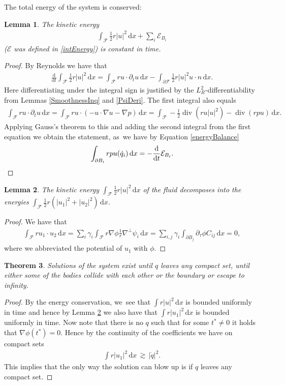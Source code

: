 \documentclass[JEP,XML,SOM,Unicode,published]{cedram}
\newtheorem{theorem}{Theorem}[subsection]
\newtheorem{lemma}[theorem]{Lemma}
\theoremstyle{definition}
\renewcommand{\div}{\operatorname{div}}
\newcommand\eq{=}
\newcommand\dd{\,\mathrm{d}}
\newcommand\dx{\dd x}
\let\de\partial
\begin{document}
The total energy of the system is conserved: \begin{lemma}\label{Lem:Energy}
The kinetic energy
\begin{align*}\int_{\mathcal{F}}\frac{1}{2}r|u|^2\dx+\sum_i\mathcal{E}_{B_i}
\end{align*}
($\mathcal{E}$ was defined in \eqref{intEnergy}) is constant in time.
\end{lemma}
\begin{proof}
By Reynolds we have that
\begin{align*}
\frac{\text{d}}{\text{d}t}\int_{\mathcal{F}}\frac{1}{2}r|u|^2\dx\eq\int_{\mathcal{F}}ru\cdot\de_t u\dx-\int_{\de\mathcal{F}}\frac{1}{2}r|u|^2u\cdot n\dx.
\end{align*}
Here differentiating under the integral sign is justified by the $L_R^2$-differentiability from Lemmas \ref{SmoothnessInq} and \ref{PsiDeri}. The first integral also equals
\begin{align*}
\int_{\mathcal{F}}ru\cdot\de_t u\dx\eq\int_{\mathcal{F}}ru\cdot(-u\cdot\nabla u-\nabla p)\dx\eq\int_{\mathcal{F}}-\frac{1}{2}\div(ru|u|^2)-\div(rpu)\dx.
\end{align*}
Applying Gauss's theorem to this and adding the second integral from the first equation we obtain the statement, as~we have by Equation \eqref{energyBalance}
\[
\int_{\de B_i}rpu(\dot{q}_i)\dx\eq-\frac{\text{d}}{\text{d}t}\mathcal{E}_{B_i}.\qedhere
\]
\end{proof}

\begin{lemma}\label{EnergySplitting}
The kinetic energy $\int_{\mathcal{F}}\frac{1}{2}r|u|^2\dx$ of the fluid decomposes into the energies $\int_{\mathcal{F}} \frac{1}{2}r(|u_1|^2+|u_2|^2)\dx$.
\end{lemma}
\begin{proof}
We have that
\begin{align*}
\int_{\mathcal{F}}ru_1\cdot u_2\dx\eq\sum_i\gamma_i\int_{\mathcal{F}}r\nabla\phi\frac{1}{r}\nabla^\perp\psi_i\dx\eq\sum_{i,j}\gamma_i\int_{\de B_j}\de_\tau\phi C_{ij}\dx\eq 0,
\end{align*}
where we abbreviated the potential of $u_1$ with $\phi$.
\end{proof}

\begin{theorem}\label{Thm:exist}
Solutions of the system exist until $q$ leaves any compact set, \ie until either some of the bodies collide with each other or the boundary or escape to infinity.
\end{theorem}
\begin{proof}
By the energy conservation, we~see that $\int r|u|^2\dx$ is bounded uniformly in time and hence by Lemma \ref{EnergySplitting} we also have that $\int r|u_1|^2\dx$ is bounded uniformly in time. Now note that there is no $q$ such that for some $t^*\neq 0$ it holds that $\nabla\phi(t^*)=0$. Hence by the continuity of the coefficients we have on compact sets
\begin{align*}\int r|u_1|^2\dx\,\gtrsim\, |\dot{q}|^2.
\end{align*}
This implies that the only way the solution can blow up is if $q$ leaves any compact set.
\end{proof}
\end{document}
